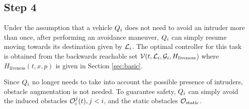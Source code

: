\subsection{Step 4}
Under the assumption that a vehicle $Q_{i}$ does not need to avoid an intruder more than once, after performing an avoidance maneuver, $Q_{i}$ can simply resume moving towards its destination given by $\mathcal{L}_i$. The optimal controller for this task is obtained from the backwards reachable set $\mathcal{V}(t, \mathcal{L}_i, \mathcal{G}_i, H_\text{liveness}$) where $H_\text{liveness}(t, x, p)$ is given in Section \ref{sec:basic}.

Since $Q_{i}$ no longer needs to take into account the possible presence of intruders, obstacle augmentation is not needed. To guarantee safety, $Q_{i}$ can simply avoid the induced obstacles $\mathcal{O}_i^j(t), j < i$, and the static obstacles $\mathcal{O}_\text{static}$.